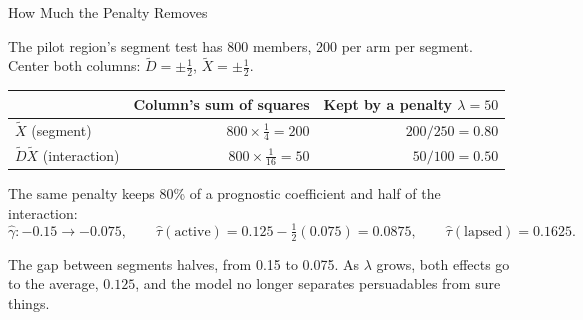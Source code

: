 \documentclass[aspectratio=169, 11pt, handout]{beamer}
\newcommand{\hatt}{\hat{\tau}}
\begin{document}
\begin{frame}{How Much the Penalty Removes}

The pilot region's segment test has 800 members, 200 per arm per segment. Center both columns: $\tilde D = \pm\tfrac12$, $\tilde X = \pm\tfrac12$.

\begin{center}
\begin{tabular}{lrr}
\toprule
& \textbf{Column's sum of squares} & \textbf{Kept by a penalty $\lambda = 50$} \\
\midrule
$\tilde X$ (segment) & $800 \times \tfrac14 = 200$ & $200/250 = 0.80$ \\
$\tilde D\tilde X$ (interaction) & $800 \times \tfrac1{16} = 50$ & $50/100 = 0.50$ \\
\bottomrule
\end{tabular}
\end{center}

\medskip

The same penalty keeps 80\% of a prognostic coefficient and half of the interaction:
\[
\hat\gamma: -0.15 \to -0.075, \qquad \hatt(\text{active}) = 0.125 - \tfrac12(0.075) = 0.0875, \qquad \hatt(\text{lapsed}) = 0.1625 .
\]

\medskip

The gap between segments halves, from 0.15 to 0.075. As $\lambda$ grows, both effects go to the average, $0.125$, and the model no longer separates persuadables from sure things.
\end{frame}
\end{document}
